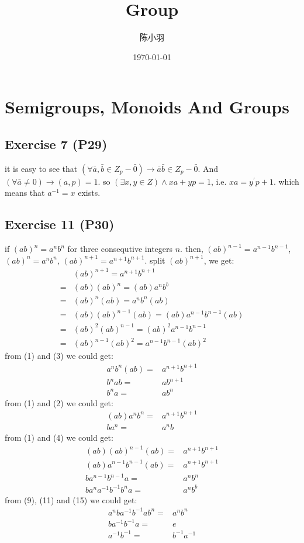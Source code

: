 \documentclass[11pt]{article}
\author{陈小羽}
\date{\today}
\title{Group}
\begin{document}
\maketitle
\tableofcontents


\section{Semigroups, Monoids And Groups}
\label{sec:org4701788}
\subsection{Exercise 7 (P29)}
\label{sec:org7a8adbf}
it is easy to see that \((\forall \bar{a}, \bar{b} \in Z_p - \bar{0})\to \bar{a}\bar{b}\in Z_p - \bar{0}\).
And \((\forall \bar{a} \not= 0) \to (a, p) = 1\). so \((\exists x, y \in Z)\land xa + yp = 1\), i.e. \(xa = y^{'}p + 1\).
which means that \(a^{-1} = x\) exists.
\subsection{Exercise 11 (P30)}
\label{sec:org87d9076}
if \((ab)^n = a^nb^n\) for three consequtive integers \(n\).
then, \((ab)^{n-1} = a^{n-1}b^{n-1}\), \((ab)^n = a^nb^n\), \((ab)^{n+1} = a^{n+1}b^{n+1}\).
split \((ab)^{n+1}\), we get:
\begin{align}
     & (ab)^{n+1}         = a^{n+1}b^{n+1} \\
    =& (ab)(ab)^n         = (ab)a^nb^b \\
    =& (ab)^n(ab)         = a^nb^n(ab) \\
    =& (ab)(ab)^{n-1}(ab) = (ab)a^{n-1}b^{n-1}(ab) \\
    =& (ab)^2(ab)^{n-1}   = (ab)^2a^{n-1}b^{n-1} \\
    =& (ab)^{n-1}(ab)^2   = a^{n-1}b^{n-1}(ab)^2
\end{align}
from (1) and (3) we could get:
\begin{align}
     a^nb^n(ab) =& a^{n+1}b^{n+1} \\
         b^nab  =& ab^{n+1} \\
           b^na =& ab^n
\end{align}
from (1) and (2) we could get:
\begin{align}
     (ab)a^nb^n =& a^{n+1}b^{n+1} \\
     ba^n       =& a^nb
\end{align}
from (1) and (4) we could get:
\begin{align}
     (ab)(ab)^{n-1}(ab) =& a^{n+1}b^{n+1} \\
     (ab)a^{n-1}b^{n-1}(ab) =& a^{n+1}b^{n+1} \\
       ba^{n-1}b^{n-1}a =& a^nb^n \\
       ba^na^{-1}b^{-1}b^na =& a^nb^b
\end{align}
from (9), (11) and (15) we could get:
\begin{align}
     a^nba^{-1}b^{-1}ab^n =& a^nb^n \\
        ba^{-1}b^{-1}a    =& e \\
         a^{-1}b^{-1}     =& b^{-1}a^{-1}
\end{align}
\end{document}
